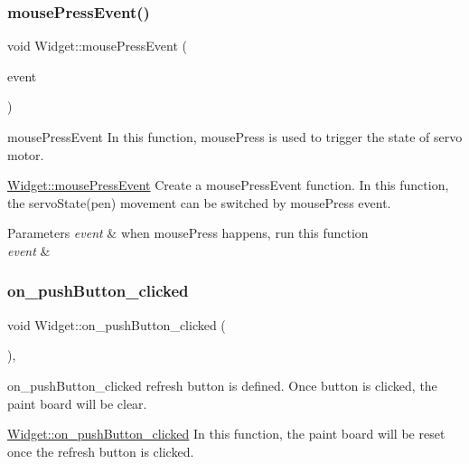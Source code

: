 \subsubsection{\texorpdfstring{mousePressEvent()}{mousePressEvent()}}
{\footnotesize\ttfamily void Widget\+::mouse\+Press\+Event (\begin{DoxyParamCaption}\item[{Q\+Mouse\+Event $\ast$}]{event }\end{DoxyParamCaption})\hspace{0.3cm}{\ttfamily [protected]}}



mouse\+Press\+Event In this function, mouse\+Press is used to trigger the state of servo motor. 

\mbox{\hyperlink{class_widget_a681594b94d8b48c7e7b669268f3baf81}{Widget\+::mouse\+Press\+Event}} Create a mouse\+Press\+Event function. In this function, the servo\+State(pen) movement can be switched by mouse\+Press event.


\begin{DoxyParams}{Parameters}
{\em event} & when mouse\+Press happens, run this function\\
\hline
{\em event} & \\
\hline
\end{DoxyParams}
\mbox{\label{class_widget_adb0d8836552ee8b48214c1a32a7e5246}} 
\subsubsection{\texorpdfstring{on\_pushButton\_clicked}{on\_pushButton\_clicked}}
{\footnotesize\ttfamily void Widget\+::on\+\_\+push\+Button\+\_\+clicked (\begin{DoxyParamCaption}{ }\end{DoxyParamCaption})\hspace{0.3cm}{\ttfamily [protected]}, {\ttfamily [slot]}}



on\+\_\+push\+Button\+\_\+clicked refresh button is defined. Once button is clicked, the paint board will be clear. 

\mbox{\hyperlink{class_widget_adb0d8836552ee8b48214c1a32a7e5246}{Widget\+::on\+\_\+push\+Button\+\_\+clicked}} In this function, the paint board will be reset once the refresh button is clicked. \mbox{\label{class_widget_af755e8891f462562c88c37735345a798}} 
